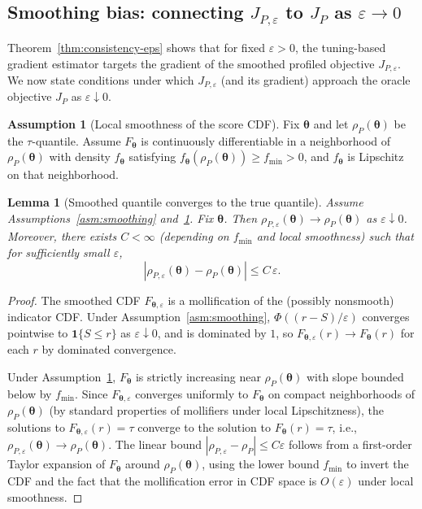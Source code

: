 \documentclass[11pt]{article}
\newcommand{\abs}[1]{\left|#1\right|}
\newcommand{\btheta}{\bm{\theta}}
\theoremstyle{plain}
\newtheorem{lemma}[theorem]{Lemma}
\theoremstyle{definition}
\newtheorem{assumption}[theorem]{Assumption}
\begin{document}
\subsection{Smoothing bias: connecting $J_{P,\varepsilon}$ to $J_P$ as $\varepsilon\to 0$}

Theorem~\ref{thm:consistency-eps} shows that for fixed $\varepsilon>0$, the tuning-based gradient estimator targets the gradient of the smoothed profiled objective $J_{P,\varepsilon}$.
We now state conditions under which $J_{P,\varepsilon}$ (and its gradient) approach the oracle objective $J_P$ as $\varepsilon\downarrow 0$.

\begin{assumption}[Local smoothness of the score CDF]\label{asm:cdf-smooth}
Fix $\btheta$ and let $\rho_P(\btheta)$ be the $\tau$-quantile.
Assume $F_{\btheta}$ is continuously differentiable in a neighborhood of $\rho_P(\btheta)$ with density $f_{\btheta}$ satisfying
$f_{\btheta}(\rho_P(\btheta))\ge f_{\min}>0$, and $f_{\btheta}$ is Lipschitz on that neighborhood.
\end{assumption}

\begin{lemma}[Smoothed quantile converges to the true quantile]\label{lem:rhoeps-to-rho}
Assume Assumptions~\ref{asm:smoothing} and~\ref{asm:cdf-smooth}. Fix $\btheta$.
Then $\rho_{P,\varepsilon}(\btheta)\to \rho_P(\btheta)$ as $\varepsilon\downarrow 0$.
Moreover, there exists $C<\infty$ (depending on $f_{\min}$ and local smoothness) such that for sufficiently small $\varepsilon$,
\[
\abs{\rho_{P,\varepsilon}(\btheta)-\rho_P(\btheta)}\le C\,\varepsilon.
\]
\end{lemma}

\begin{proof}
The smoothed CDF $F_{\btheta,\varepsilon}$ is a mollification of the (possibly nonsmooth) indicator CDF.
Under Assumption~\ref{asm:smoothing}, $\Phi((r-S)/\varepsilon)$ converges pointwise to $\mathbf{1}\{S\le r\}$ as $\varepsilon\downarrow 0$,
and is dominated by $1$, so $F_{\btheta,\varepsilon}(r)\to F_{\btheta}(r)$ for each $r$ by dominated convergence.

Under Assumption~\ref{asm:cdf-smooth}, $F_{\btheta}$ is strictly increasing near $\rho_P(\btheta)$ with slope bounded below by $f_{\min}$.
Since $F_{\btheta,\varepsilon}$ converges uniformly to $F_{\btheta}$ on compact neighborhoods of $\rho_P(\btheta)$ (by standard properties of mollifiers under local Lipschitzness),
the solutions to $F_{\btheta,\varepsilon}(r)=\tau$ converge to the solution to $F_{\btheta}(r)=\tau$, i.e., $\rho_{P,\varepsilon}(\btheta)\to \rho_P(\btheta)$.
The linear bound $\abs{\rho_{P,\varepsilon}-\rho_P}\le C\varepsilon$ follows from a first-order Taylor expansion of $F_{\btheta}$ around $\rho_P(\btheta)$,
using the lower bound $f_{\min}$ to invert the CDF and the fact that the mollification error in CDF space is $O(\varepsilon)$ under local smoothness.
\end{proof}
\end{document}
